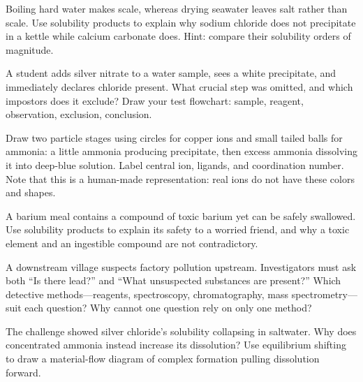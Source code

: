 \begin{sikaoti}
\item Boiling hard water makes scale, whereas drying seawater leaves salt rather than scale. Use solubility products to explain why sodium chloride does not precipitate in a kettle while calcium carbonate does. Hint: compare their solubility orders of magnitude.
\item A student adds silver nitrate to a water sample, sees a white precipitate, and immediately declares chloride present. What crucial step was omitted, and which impostors does it exclude? Draw your test flowchart: sample, reagent, observation, exclusion, conclusion.
\item Draw two particle stages using circles for copper ions and small tailed balls for ammonia: a little ammonia producing precipitate, then excess ammonia dissolving it into deep-blue solution. Label central ion, ligands, and coordination number. Note that this is a human-made representation: real ions do not have these colors and shapes.
\item A barium meal contains a compound of toxic barium yet can be safely swallowed. Use solubility products to explain its safety to a worried friend, and why a toxic element and an ingestible compound are not contradictory.
\item A downstream village suspects factory pollution upstream. Investigators must ask both ``Is there lead?'' and ``What unsuspected substances are present?'' Which detective methods---reagents, spectroscopy, chromatography, mass spectrometry---suit each question? Why cannot one question rely on only one method?
\item The challenge showed silver chloride's solubility collapsing in saltwater. Why does concentrated ammonia instead increase its dissolution? Use equilibrium shifting to draw a material-flow diagram of complex formation pulling dissolution forward.
\end{sikaoti}
